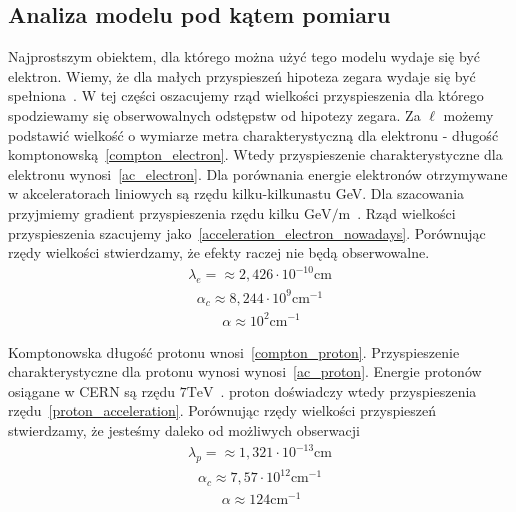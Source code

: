 \subsection{Analiza modelu pod kątem pomiaru}
Najprostszym obiektem, dla którego można użyć tego modelu wydaje się
być elektron. Wiemy, że dla małych przyspieszeń hipoteza zegara
wydaje się być spełniona~\cite{}. W tej części oszacujemy rząd 
wielkości przyspieszenia dla którego spodziewamy się 
obserwowalnych odstępstw od hipotezy zegara.
Za $\ell$ możemy podstawić wielkość o wymiarze metra 
charakterystyczną dla elektronu - długość 
komptonowską~\eqref{compton_electron}. 
Wtedy przyspieszenie charakterystyczne dla elektronu 
wynosi~\eqref{ac_electron}.
Dla porównania energie elektronów otrzymywane 
w akceleratorach liniowych są rzędu kilku-kilkunastu GeV.
Dla szacowania przyjmiemy gradient przyspieszenia rzędu
kilku $ \si{\giga\electronvolt \per \metre}$~\cite{Ghotra2015}.
Rząd wielkości przyspieszenia 
szacujemy jako~\eqref{acceleration_electron_nowadays}.
Porównując rzędy wielkości stwierdzamy, że efekty 
raczej nie będą obserwowalne.
\begin{align}\label{compton_electron}
\lambda_e = \approx 2,426 \cdot 10^{-10} \si{\centi\metre}
\end{align}
\begin{align}\label{ac_electron}
\alpha_c \approx 8,244\cdot 10^{9} \si{ \centi\metre^{-1}}
\end{align}
\begin{align}~\label{acceleration_electron_nowadays}
\alpha \approx 10^2 \si{\centi\metre^{-1}}
\end{align}

Komptonowska długość protonu wnosi~\eqref{compton_proton}. 
Przyspieszenie charakterystyczne dla protonu wynosi
wynosi~\eqref{ac_proton}.
Energie protonów osiągane w CERN są rzędu 
$7 \si{\tera\electronvolt}$~\cite{CERN}. 
proton doświadczy wtedy przyspieszenia
rzędu~\eqref{proton_acceleration}.
Porównując rzędy wielkości przyspieszeń stwierdzamy, 
że jesteśmy daleko od możliwych obserwacji
\begin{align}\label{compton_proton}
\lambda_p = \approx 1,321 \cdot 10^{-13} \si{\centi\metre}
\end{align}
\begin{align}\label{ac_proton}
\alpha_c \approx 7,57 \cdot 10^{12} \si{ \centi\metre^{-1}}
\end{align}
\begin{align}~\label{proton_acceleration}
\alpha \approx 124  \si{\centi\metre^{-1}}
\end{align}
